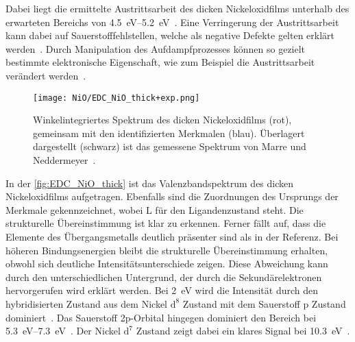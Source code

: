         Dabei liegt die ermittelte Austrittsarbeit des dicken Nickeloxidfilms unterhalb des erwarteten Bereichs von \SIrange{4.5}{5.2}{\electronvolt}~\cite{poulain_electronic_2020}.
        Eine Verringerung der Austrittsarbeit kann dabei auf Sauerstofffehlstellen, welche als negative Defekte gelten erklärt werden~\cite{IF_3}.
        Durch Manipulation des Aufdampfprozesses können so gezielt bestimmte elektronische Eigenschaft, wie zum Beispiel die Austrittsarbeit verändert werden~\cite{poulain_electronic_2020}.

        \begin{figure}
            \centering
            \texttt{[image: NiO/EDC\_NiO\_thick+exp.png]}
            \caption{Winkelintegriertes Spektrum des dicken Nickeloxidfilms (rot), gemeinsam mit den identifizierten Merkmalen (blau).
            Überlagert dargestellt (schwarz) ist das gemessene Spektrum von Marre und Neddermeyer~\cite{NiO_7}.} 
            \label{fig:EDC_NiO_thick}
        \end{figure}
        In der \autoref{fig:EDC_NiO_thick} ist das Valenzbandspektrum des dicken Nickeloxidfilms aufgetragen.
        Ebenfalls sind die Zuordnungen des Ursprungs der Merkmale gekennzeichnet, wobei L für den Ligandenzustand steht.
        Die strukturelle Übereinstimmung ist klar zu erkennen. 
        Ferner fällt auf, dass die Elemente des Übergangsmetalls deutlich präsenter sind als in der Referenz.
        Bei höheren Bindungsenergien bleibt die strukturelle Übereinstimmung erhalten, obwohl sich deutliche Intensitätsunterschiede zeigen.
        Diese Abweichung kann durch den unterschiedlichen Untergrund, der durch die Sekundärelektronen hervorgerufen wird erklärt werden.
        Bei \SI{2}{\electronvolt} wird die Intensität durch den hybridisierten Zustand aus dem Nickel $\text{d}^8$ Zustand mit dem Sauerstoff p Zustand dominiert~\cite{NiO_13}.
        Das Sauerstoff 2p-Orbital hingegen dominiert den Bereich bei \SIrange[range-phrase=\:und\:]{5.3}{7.3}{\electronvolt}~\cite{NiO_13}.
        Der Nickel $\text{d}^7$ Zustand zeigt dabei ein klares Signal bei \SI{10.3}{\electronvolt}~\cite{NiO_13}.

